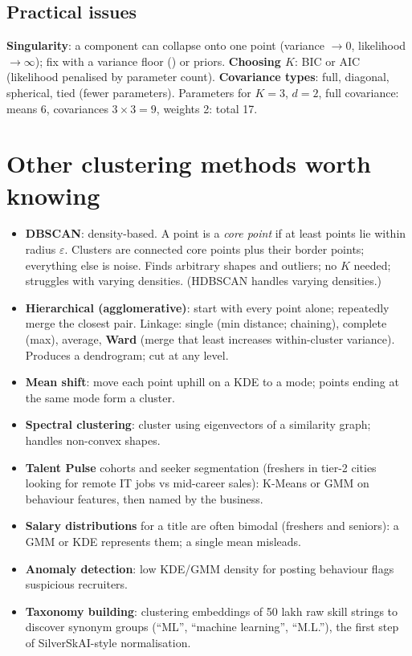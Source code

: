 \subsection{Practical issues}
\textbf{Singularity}: a component can collapse onto one point (variance $\to0$, likelihood $\to\infty$); fix with a variance floor
() or priors. \textbf{Choosing $K$}: BIC or AIC (likelihood penalised by parameter count). \textbf{Covariance types}:
full, diagonal, spherical, tied (fewer parameters). Parameters for $K = 3$, $d = 2$, full covariance: means 6, covariances $3\times3 = 9$,
weights 2: total 17.

\section{Other clustering methods worth knowing}
\begin{itemize}
\item \textbf{DBSCAN}: density-based. A point is a \emph{core point} if at least  points lie within radius $\varepsilon$. Clusters
  are connected core points plus their border points; everything else is noise. Finds arbitrary shapes and outliers; no $K$ needed;
  struggles with varying densities. (HDBSCAN handles varying densities.)
\item \textbf{Hierarchical (agglomerative)}: start with every point alone; repeatedly merge the closest pair. Linkage: single (min distance;
  chaining), complete (max), average, \textbf{Ward} (merge that least increases within-cluster variance). Produces a dendrogram; cut at any
  level.
\item \textbf{Mean shift}: move each point uphill on a KDE to a mode; points ending at the same mode form a cluster.
\item \textbf{Spectral clustering}: cluster using eigenvectors of a similarity graph; handles non-convex shapes.
\end{itemize}

\begin{practical}
\begin{itemize}
\item \textbf{Talent Pulse} cohorts and seeker segmentation (freshers in tier-2 cities looking for remote IT jobs vs mid-career sales):
  K-Means or GMM on behaviour features, then named by the business.
\item \textbf{Salary distributions} for a title are often bimodal (freshers and seniors): a GMM or KDE represents them; a single mean misleads.
\item \textbf{Anomaly detection}: low KDE/GMM density for posting behaviour flags suspicious recruiters.
\item \textbf{Taxonomy building}: clustering embeddings of 50 lakh raw skill strings to discover synonym groups (``ML'', ``machine learning'',
  ``M.L.''), the first step of SilverSkAI-style normalisation.
\end{itemize}
\end{practical}

